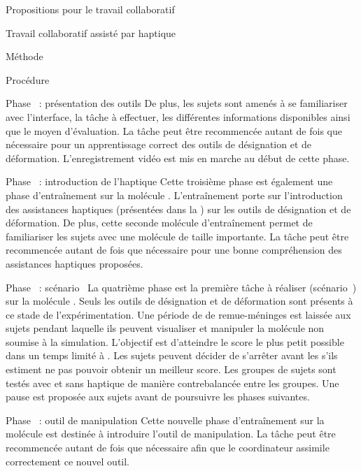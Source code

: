 \documentclass[myfrancais]{mythesis}
\begin{document}
\begin{mypart}{Propositions pour le travail collaboratif}
\begin{mychapter}{Travail collaboratif assisté par haptique}
\begin{mysection}{Méthode}
\begin{mysubsection}{Procédure}
\begin{myparagraph}{Phase~ : présentation des outils}
						De plus, les sujets sont amenés à se familiariser avec l'interface, la tâche à effectuer, les différentes informations disponibles ainsi que le moyen d'évaluation.
						La tâche peut être recommencée autant de fois que nécessaire pour un apprentissage correct des outils de désignation et de déformation.
						L'enregistrement vidéo est mis en marche au début de cette phase.
					\end{myparagraph}
					\begin{myparagraph}{Phase~ : introduction de l'haptique}
						Cette troisième phase est également une phase d'entraînement sur la molécule \myPrion.
						L'entraînement porte sur l'introduction des assistances haptiques (présentées dans la ) sur les outils de désignation et de déformation.
						De plus, cette seconde molécule d'entraînement permet de familiariser les sujets avec une molécule de taille importante.
						La tâche peut être recommencée autant de fois que nécessaire pour une bonne compréhension des assistances haptiques proposées.
					\end{myparagraph}
					\begin{myparagraph}{Phase~ : scénario~}
						La quatrième phase est la première tâche à réaliser (scénario~) sur la molécule \myUbiquitin.
						Seuls les outils de désignation et de déformation sont présents à ce stade de l'expérimentation.
						Une période de  de remue-méninges est laissée aux sujets pendant laquelle ils peuvent visualiser et manipuler la molécule non soumise à la simulation.
						L'objectif est d'atteindre le score  le plus petit possible dans un temps limité à .
						Les sujets peuvent décider de s'arrêter avant les  s'ils estiment ne pas pouvoir obtenir un meilleur score.
						Les groupes de sujets sont testés avec et sans haptique de manière contrebalancée entre les groupes.
						Une pause est proposée aux sujets avant de poursuivre les phases suivantes.
					\end{myparagraph}
					\begin{myparagraph}{Phase~ : outil de manipulation}
						Cette nouvelle phase d'entraînement sur la molécule \myTRPZIPPER est destinée à introduire l'outil de manipulation.
						La tâche peut être recommencée autant de fois que nécessaire afin que le coordinateur assimile correctement ce nouvel outil.

\end{myparagraph}
\end{mysubsection}
\end{mysection}
\end{mychapter}
\end{mypart}
\end{document}
